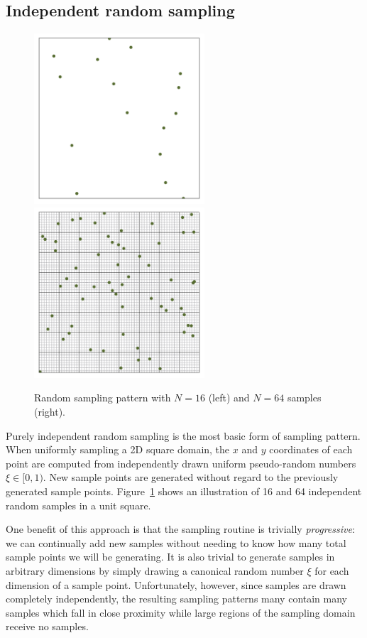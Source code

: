 \documentclass[11pt,fleqn]{book} %
\begin{document}
\subsection{Independent random sampling}
%
\begin{figure}[ht]
  \centering
  \includegraphics[width=2.5in]{Pictures/pointset-gridvisualize/points-random-n16.pdf}
    \includegraphics[width=2.5in]{./Pictures/pointset-gridvisualize/points-random-n64.pdf}
  \caption{Random sampling pattern with $N=16$ (left) and $N = 64$ samples (right).}
  \label{fig:random}
\end{figure}
%
Purely independent random sampling is the most basic form of sampling pattern. When uniformly sampling a 2D square domain, the $x$ and $y$ coordinates of each point are computed from independently drawn uniform pseudo-random numbers $\xi \in [0,1)$. New sample points are generated without regard to the previously generated sample points. Figure~\ref{fig:random} shows an illustration of 16 and 64 independent random samples in a unit square.

One benefit of this approach is that the sampling routine is trivially \textit{progressive}: we can continually add new samples without needing to know how many total sample points we will be generating. It is also trivial to generate samples in arbitrary dimensions by simply drawing a canonical random number $\xi$ for each dimension of a sample point. Unfortunately, however, since samples are drawn completely independently, the resulting sampling patterns many contain many samples which fall in close proximity while large regions of the sampling domain receive no samples.
\end{document}
